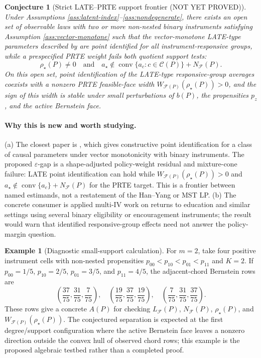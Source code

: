 \documentclass[11pt]{article}
\theoremstyle{definition}
\newtheorem{example}{Example}
\theoremstyle{plain}
\newtheorem{conjecture}{Conjecture}
\theoremstyle{remark}
\begin{document}
\begin{conjecture}[Strict LATE--PRTE support frontier (NOT YET PROVED)]\label{conj:late-separation}
Under Assumptions \ref{ass:latent-index}--\ref{ass:nondegenerate}, there exists an open set of observable laws with two or more non-nested binary instruments satisfying Assumption \ref{ass:vector-monotone} such that the vector-monotone LATE-type parameters described by \citet{Goff2024} are point identified for all instrument-responsive groups, while a prespecified PRTE weight fails both quotient support tests:
\[
\rho_\star(P)\neq0
\quad\text{and}\quad
a_\star\notin \operatorname{conv}\{a_c:c\in\mathcal C(P)\}+N_{\mathcal F}(P).
\]
On this open set, point identification of the LATE-type responsive-group averages coexists with a nonzero PRTE feasible-face width \(W_{\mathcal F(P)}(\rho_\star(P))>0\), and the sign of this width is stable under small perturbations of \(b(P)\), the propensities \(p_z\), and the active Bernstein face.
\end{conjecture}

\paragraph{Why this is new and worth studying.}
(a) The closest paper is \citet{Goff2024}, which gives constructive point identification for a class of causal parameters under vector monotonicity with binary instruments. The proposed \(\varepsilon\)-gap is a shape-adjusted policy-weight residual and mixture-cone failure: LATE point identification can hold while \(W_{\mathcal F(P)}(\rho_\star(P))>0\) and \(a_\star\notin\operatorname{conv}\{a_c\}+N_{\mathcal F}(P)\) for the PRTE target. This is a frontier between named estimands, not a restatement of the Han--Yang or MST LP. (b) The concrete consumer is applied multi-IV work on returns to education and similar settings using several binary eligibility or encouragement instruments; the result would warn that identified responsive-group effects need not answer the policy-margin question.

\begin{example}[Diagnostic small-support calculation]\label{ex:small-support}
For \(m=2\), take four positive instrument cells with non-nested propensities \(p_{00}<p_{10}<p_{01}<p_{11}\) and \(K=2\). If \(p_{00}=1/5\), \(p_{10}=2/5\), \(p_{01}=3/5\), and \(p_{11}=4/5\), the adjacent-chord Bernstein rows are
\[
\left(\frac{37}{75},\frac{31}{75},\frac{7}{75}\right),\quad
\left(\frac{19}{75},\frac{37}{75},\frac{19}{75}\right),\quad
\left(\frac{7}{75},\frac{31}{75},\frac{37}{75}\right).
\]
These rows give a concrete \(A(P)\) for checking \(L_{\mathcal F}(P)\), \(N_{\mathcal F}(P)\), \(\rho_\star(P)\), and \(W_{\mathcal F(P)}(\rho_\star(P))\). The conjectured separation is expected at the first degree/support configuration where the active Bernstein face leaves a nonzero direction outside the convex hull of observed chord rows; this example is the proposed algebraic testbed rather than a completed proof.
\end{example}
\end{document}
